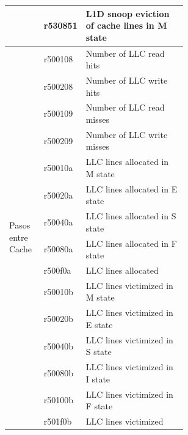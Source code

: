 \begin{table}[]
\begin{tabular}{|l|l|p{0.58\linewidth}|}
                                    & r530851  & L1D snoop eviction of cache lines in M state               \\ \hline
\multirow{15}{*}{Pasos entre Cache} & r500108  & Number of LLC read hits                                    \\ \cline{2-3} 
                                    & r500208  & Number of LLC write hits                                   \\ \cline{2-3} 
                                    & r500109  & Number of LLC read misses                                  \\ \cline{2-3} 
                                    & r500209  & Number of LLC write misses                                 \\ \cline{2-3} 
                                    & r50010a  & LLC lines allocated in M state                             \\ \cline{2-3} 
                                    & r50020a  & LLC lines allocated in E state                             \\ \cline{2-3} 
                                    & r50040a  & LLC lines allocated in S state                             \\ \cline{2-3} 
                                    & r50080a  & LLC lines allocated in F state                             \\ \cline{2-3} 
                                    & r500f0a  & LLC lines allocated                                        \\ \cline{2-3} 
                                    & r50010b  & LLC lines victimized in M state                            \\ \cline{2-3} 
                                    & r50020b  & LLC lines victimized in E state                            \\ \cline{2-3} 
                                    & r50040b  & LLC lines victimized in S state                            \\ \cline{2-3} 
                                    & r50080b  & LLC lines victimized in I state                            \\ \cline{2-3} 
                                    & r50100b  & LLC lines victimized in F state                            \\ \cline{2-3} 
                                    & r501f0b  & LLC lines victimized                                       \\ \hline

\end{tabular}
\end{table}
